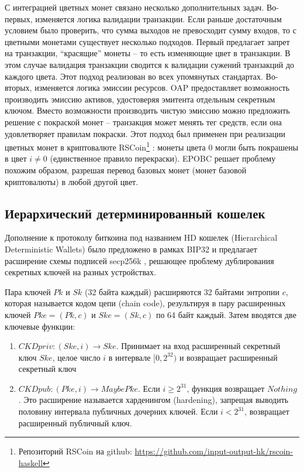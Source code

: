 \documentclass[specification,annotation]{itmo-student-thesis}
\begin{document}
С интеграцией цветных монет связано несколько дополнительных
задач. Во-первых, изменяется логика валидации транзакции. Если раньше
достаточным условием было проверить, что сумма выходов не превосходит
сумму входов, то с цветными монетами существует несколько
подходов. Первый предлагает запрет на транзакции, ``красящие'' монеты
-- то есть изменяющие цвет в транзакции. В этом случае валидация
транзакции сводится к валидации сужений транзакций до каждого
цвета. Этот подход реализован во всех упомянутых
стандартах. Во-вторых, изменяется логика эмиссии ресурсов. OAP
предоставляет возможность производить эмиссию активов, удостоверяя
эмитента отдельным секретным ключом. Вместо возможности производить
чистую эмиссию можно предложить решение с покраской монет --
транзакция может менять тег средств, если она удовлетворяет правилам
покраски. Этот подход был применен при реализации цветных монет в
криптовалюте RSCoin\footnote{Репозиторий RSCoin на github:
  \url{https://github.com/input-output-hk/rscoin-haskell}}
\cite{rscoin}: монеты цвета $0$ могли быть покрашены в
цвет $i \neq 0$ (единственное правило перекраски). EPOBC решает
проблему похожим образом, разрешая перевод базовых монет (монет
базовой криптовалюты) в любой другой цвет.

\subsection{Иерархический детерминированный кошелек}

Дополнение к протоколу биткоина под названием HD кошелек (Hierarchical
Deterministic Wallets) было предложено в рамках BIP32 \cite{hdwallets}
и предлагает расширение схемы подписей secp256k \cite{sec20002},
решающее проблему дублирования секретных ключей на разных устройствах.

Пара ключей $Pk$ и $Sk$ (32 байта каждый) расширяются 32 байтами
энтропии $c$, которая называется кодом цепи (chain code), результируя
в пару расширенных ключей $Pke = (Pk, c)$ и $Ske = (Sk, c)$ по 64 байт
каждый. Затем вводятся две ключевые функции:

\begin{enumerate}
\item $CKDpriv : (Ske, i) \rightarrow Ske$. Принимает на вход расширенный
  секретный ключ $Ske$, целое число $i$ в интервале $[0, 2^{32})$ и
  возвращает расширенный секретный ключ
\item $CKDpub : (Pke, i) \rightarrow Maybe Pke$. Если $i \geq 2^{31}$, функция
  возвращает $Nothing$. Это расширение называется харденингом
  (hardening), запрещая выводить половину интервала публичных дочерних
  ключей. Если $i < 2^{31}$, возвращает расширенный публичный ключ.
\end{enumerate}
\end{document}
